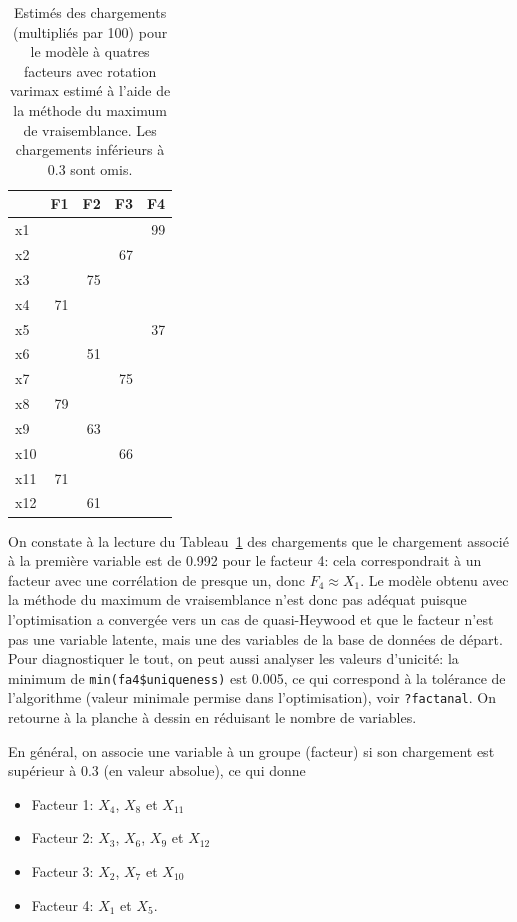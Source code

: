 \documentclass[
  11pt,
  letterpaper,
]{book}
\providecommand{\tightlist}{%
  \setlength{\itemsep}{0pt}\setlength{\parskip}{0pt}}\usepackage{longtable,booktabs,array}
\theoremstyle{definition}
\theoremstyle{remark}
\begin{document}
\hypertarget{tbl-factanal4}{}
\begin{table}
\caption{\label{tbl-factanal4}Estimés des chargements (multipliés par 100) pour le modèle à quatres
facteurs avec rotation varimax estimé à l'aide de la méthode du maximum
de vraisemblance. Les chargements inférieurs à 0.3 sont omis. }\tabularnewline

\centering
\begin{tabular}{lrrrr}
\toprule
  & F1 & F2 & F3 & F4\\
\midrule
x1 &  &  &  & 99\\
x2 &  &  & 67 & \\
x3 &  & 75 &  & \\
x4 & 71 &  &  & \\
x5 &  &  &  & 37\\
\addlinespace
x6 &  & 51 &  & \\
x7 &  &  & 75 & \\
x8 & 79 &  &  & \\
x9 &  & 63 &  & \\
x10 &  &  & 66 & \\
\addlinespace
x11 & 71 &  &  & \\
x12 &  & 61 &  & \\
\bottomrule
\end{tabular}
\end{table}

On constate à la lecture du Tableau~\ref{tbl-factanal4} des chargements
que le chargement associé à la première variable est de 0.992 pour le
facteur 4: cela correspondrait à un facteur avec une corrélation de
presque un, donc \(F_4 \approx X_1\). Le modèle obtenu avec la méthode
du maximum de vraisemblance n'est donc pas adéquat puisque
l'optimisation a convergée vers un cas de quasi-Heywood et que le
facteur n'est pas une variable latente, mais une des variables de la
base de données de départ. Pour diagnostiquer le tout, on peut aussi
analyser les valeurs d'unicité: la minimum de
\texttt{min(fa4\$uniqueness)} est 0.005, ce qui correspond à la
tolérance de l'algorithme (valeur minimale permise dans l'optimisation),
voir \texttt{?factanal}. On retourne à la planche à dessin en réduisant
le nombre de variables.

En général, on associe une variable à un groupe (facteur) si son
chargement est supérieur à 0.3 (en valeur absolue), ce qui donne

\begin{itemize}
\tightlist
\item
  Facteur 1: \(X_4\), \(X_8\) et \(X_{11}\)
\item
  Facteur 2: \(X_3\), \(X_6\), \(X_9\) et \(X_{12}\)
\item
  Facteur 3: \(X_2\), \(X_7\) et \(X_{10}\)
\item
  Facteur 4: \(X_1\) et \(X_5\).
\end{itemize}
\end{document}
